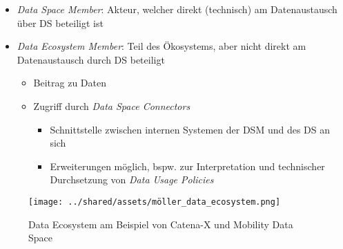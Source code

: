 \begin{itemize}
    \item \emph{Data Space Member}: Akteur, welcher direkt (technisch) am Datenaustausch über DS beteiligt ist
    \item \emph{Data Ecosystem Member}: Teil des Ökosystems, aber nicht direkt am Datenaustausch durch DS beteiligt
    \begin{itemize}
        \item Beitrag zu Daten
        \item Zugriff durch \emph{Data Space Connectors}
        \begin{itemize}
            \item Schnittstelle zwischen internen Systemen der DSM und des DS an sich
            \item Erweiterungen möglich, bspw. zur Interpretation und technischer Durchsetzung von \emph{Data Usage Policies}~\cite{mollerIndustrialDataEcosystems2024}
        \end{itemize}
    \end{itemize}
\end{itemize}

\begin{figure}
    \texttt{[image: ../shared/assets/möller\_data\_ecosystem.png]}
    \caption{Data Ecosystem am Beispiel von Catena-X und Mobility Data Space~\cite{mollerIndustrialDataEcosystems2024}}
\end{figure}


